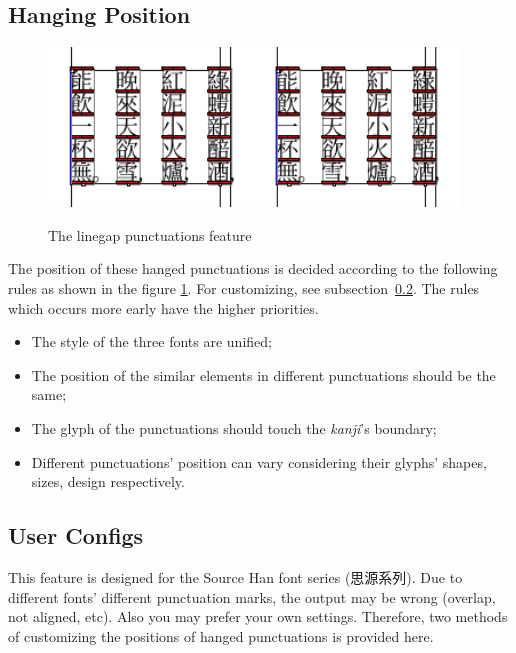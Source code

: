 \documentclass[twoside]{article}
\begin{document}
\subsection{Hanging Position}
\begin{figure}[htb]
    \centering
    \includegraphics[height = 120pt]{figure/fig-tc.pdf}\quad\includegraphics[height = 120pt]{figure/fig-jp.pdf}
    \caption{The linegap punctuations feature}
    \label{fig:lgp}
\end{figure}
The position of these hanged punctuations is decided according to the following rules as shown in the figure \ref{fig:lgp}. For customizing, see subsection~\ref{sec:config}. The rules which occurs more early have the higher priorities.
\begin{itemize}
    \item The style of the three fonts are unified;
    \item The position of the similar elements in different punctuations should be the same;
    \item The glyph of the punctuations should touch the \textit{kanji\/}'s boundary;
    \item Different punctuations' position can vary considering their glyphs' shapes, sizes, design respectively.
\end{itemize}

\subsection{User Configs}
\label{sec:config}
This feature is designed for the Source Han font series (思源系列). Due to different fonts' different punctuation marks, the output may be wrong (overlap, not aligned, etc). Also you may prefer your own settings. Therefore, two methods of customizing the positions of hanged punctuations is provided here.
\end{document}

